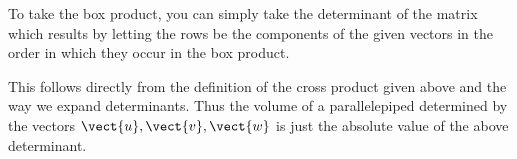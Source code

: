 To take the box product, you can simply take the
determinant of the matrix which results by letting the rows be the
components of the given vectors in the order in which they occur
in the box product. 

This follows directly from the definition of the cross product given above
and the way we expand determinants. Thus the volume of a parallelepiped
determined by the vectors $\vect{u},\vect{v},\vect{w}$ is just the
absolute value of the above determinant.
